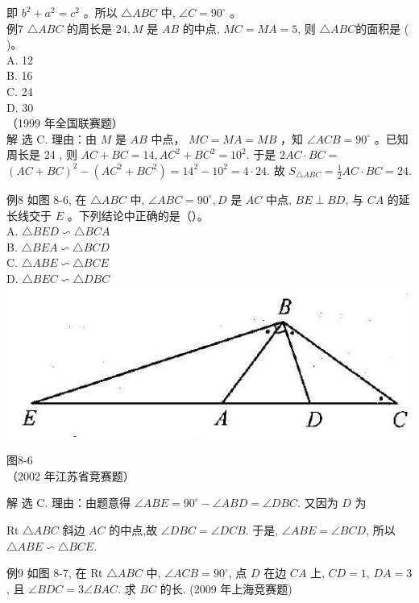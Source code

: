 \documentclass[10pt]{article}
\begin{document}
即 $b^{2}+a^{2}=c^{2}$ 。所以 $\triangle A B C$ 中, $\angle C=90^{\circ}$ 。\\
例7 $\triangle A B C$ 的周长是 $24, M$ 是 $A B$ 的中点, $M C=M A=5$, 则 $\triangle A B C$的面积是 ( )。\\
A. 12\\
B. 16\\
C. 24\\
D. 30\\
（1999 年全国联赛题）\\
解 选 C. 理由：由 $M$ 是 $A B$ 中点， $M C=M A=M B$ ，知 $\angle A C B=90^{\circ}$ 。已知周长是 24 , 则 $A C+B C=14, A C^{2}+B C^{2}=10^{2}$. 于是 $2 A C \cdot B C=$ $(A C+B C)^{2}-\left(A C^{2}+B C^{2}\right)=14^{2}-10^{2}=4 \cdot 24$. 故 $S_{\triangle A B C}=\frac{1}{2} A C \cdot B C=24$.

例8 如图 8-6, 在 $\triangle A B C$ 中, $\angle A B C=90^{\circ}, D$ 是 $A C$ 中点, $B E \perp B D$, 与 $C A$ 的延长线交于 $E$ 。下列结论中正确的是（）。\\
A. $\triangle B E D \backsim \triangle B C A$\\
B. $\triangle B E A \backsim \triangle B C D$\\
C. $\triangle A B E \backsim \triangle B C E$\\
D. $\triangle B E C \backsim \triangle D B C$\\
\includegraphics[max width=\textwidth, center]{2024_10_30_2c8f45efd4a519b08e1ag-084}

图8-6\\
（2002 年江苏省竞赛题）

解 选 C. 理由：由题意得 $\angle A B E=90^{\circ}-\angle A B D=\angle D B C$. 又因为 $D$ 为

Rt $\triangle A B C$ 斜边 $A C$ 的中点,故 $\angle D B C=\angle D C B$. 于是, $\angle A B E=\angle B C D$, 所以 $\triangle A B E \backsim \triangle B C E$.

例9 如图 8-7, 在 Rt $\triangle A B C$ 中, $\angle A C B=90^{\circ}$, 点 $D$ 在边 $C A$ 上, $C D=1$, $D A=3$, 且 $\angle B D C=3 \angle B A C$. 求 $B C$ 的长. (2009 年上海竞赛题)
\end{document}
